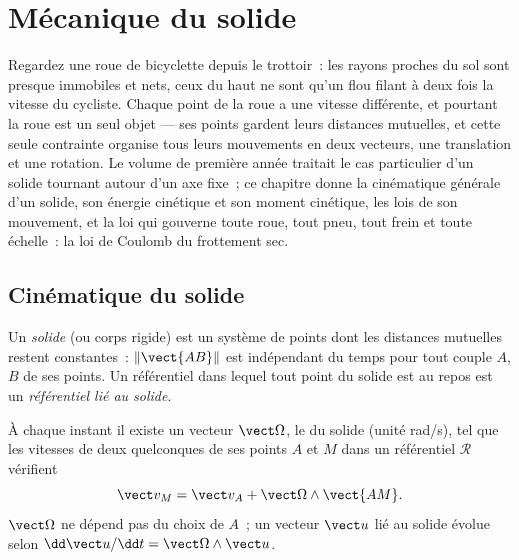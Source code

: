 \chapter{Mécanique du solide}\label{ch:b2:rigid-body-mechanics}

Regardez une roue de bicyclette depuis le trottoir~: les rayons proches
du sol sont presque immobiles et nets, ceux du haut ne sont qu'un flou
filant à deux fois la vitesse du cycliste. Chaque point de la roue a une
vitesse différente, et pourtant la roue est un seul objet --- ses points
gardent leurs distances mutuelles, et cette seule contrainte organise
tous leurs mouvements en deux vecteurs, une translation et une rotation.
Le volume de première année traitait le cas particulier d'un solide
tournant autour d'un axe fixe~; ce chapitre donne la cinématique
générale d'un solide, son énergie cinétique et son moment cinétique, les
lois de son mouvement, et la loi qui gouverne toute roue, tout pneu,
tout frein et toute échelle~: la loi de Coulomb du frottement sec.

\section{Cinématique du solide}

\begin{definition}[Solide]\label{def:b2:rigid-body-mechanics:solid}
Un \emph{solide} (ou corps rigide) est un système de points dont les
distances mutuelles restent constantes~: $\|\vect{AB}\|$ est indépendant
du temps pour tout couple $A$, $B$ de ses points. Un référentiel dans
lequel tout point du solide est au repos est un \emph{référentiel lié au
solide}.
\end{definition}

\begin{theorem}\label{thm:b2:rigid-body-mechanics:field}
À chaque instant il existe un vecteur $\vect\Omega$, le \emph{} du solide (unité \unit{rad/s}), tel que les vitesses de deux
quelconques de ses points $A$ et $M$ dans un référentiel $\mathcal R$ vérifient
\[
\vect v_M = \vect v_A + \vect\Omega\wedge\vect{AM} .
\]
$\vect\Omega$ ne dépend pas du choix de $A$~; un vecteur $\vect u$ lié
au solide évolue selon $\dd\vect u/\dd t = \vect\Omega\wedge\vect u$.
\end{theorem}

